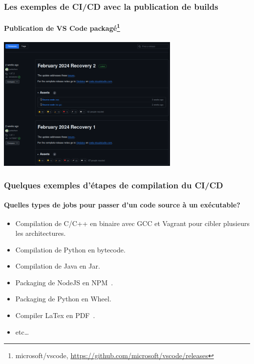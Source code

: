 \documentclass{beamer}
\begin{document}
    \begin{frame}
        \frametitle{Les exemples de CI/CD avec la publication de builds}
        \framesubtitle{Publication de VS Code packagé\footnote{microsoft/vscode, \url{https://github.com/microsoft/vscode/releases}}}
        \transdissolve
        \centering
        \includegraphics[width=9cm]{image/vs-code-release}
    \end{frame}

    \begin{frame}
        \frametitle{Quelques exemples d'étapes de compilation du CI/CD}
        \framesubtitle{Quelles types de jobs pour passer d'un code source à un exécutable?}
        \transdissolve
        \pause
        \begin{itemize}
            \item Compilation de C/C++ en binaire avec GCC et Vagrant pour cibler plusieurs les architectures.
            \item Compilation de Python en bytecode.
            \item Compilation de Java en Jar.
            \item Packaging de NodeJS en NPM~.
            \item Packaging de Python en Wheel.
            \item Compiler LaTex en PDF~.
            \item etc\ldots
        \end{itemize}
    \end{frame}
\end{document}
